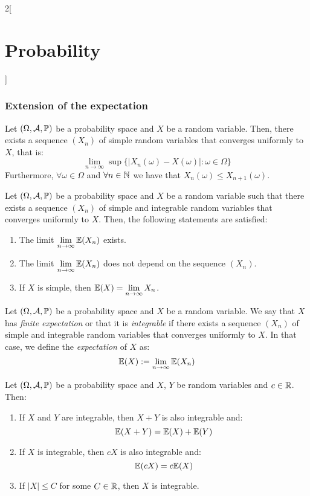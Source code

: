 \documentclass[../../../main.tex]{subfiles}
\begin{document}
\begin{multicols}{2}[\section{Probability}]
  \subsubsection{Extension of the expectation}
  \begin{prop}
    Let $(\Omega,\mathcal{A},\mathbb{P})$ be a probability space and $X$ be a random variable. Then, there exists a sequence $(X_n)$ of simple random variables that converges uniformly to $X$, that is: $$\lim_{n\to\infty}\sup\{|X_n(\omega)-X(\omega)|:\omega\in\Omega\}$$ Furthermore, $\forall\omega\in\Omega$ and $\forall n\in\mathbb{N}$ we have that $X_n(\omega)\leq X_{n+1}(\omega)$.
  \end{prop}
  \begin{theorem}
    Let $(\Omega,\mathcal{A},\mathbb{P})$ be a probability space and $X$ be a random variable such that there exists a sequence $(X_n)$ of simple and integrable random variables that converges uniformly to $X$. Then, the following statements are satisfied:
    \begin{enumerate}
      \item The limit $\displaystyle\lim_{n\to\infty}\mathbb{E}(X_n)$ exists.
      \item The limit $\displaystyle\lim_{n\to\infty}\mathbb{E}(X_n)$ does not depend on the sequence $(X_n)$.
      \item If $X$ is simple, then $\displaystyle\mathbb{E}(X)=\lim_{n\to\infty}X_n$.
    \end{enumerate}
  \end{theorem}
  \begin{definition}[Expectation]
    Let $(\Omega,\mathcal{A},\mathbb{P})$ be a probability space and $X$ be a random variable. We say that $X$ has \textit{finite expectation} or that it is \textit{integrable} if there exists a sequence $(X_n)$ of simple and integrable random variables that converges uniformly to $X$. In that case, we define the \textit{expectation} of $X$ as: $$\mathbb{E}(X):=\lim_{n\to\infty}\mathbb{E}(X_n)$$
  \end{definition}
  \begin{prop}
    Let $(\Omega,\mathcal{A},\mathbb{P})$ be a probability space and $X$, $Y$ be random variables and $c\in\mathbb{R}$. Then:
    \begin{enumerate}
      \item If $X$ and $Y$ are integrable, then $X+Y$ is also integrable and: $$\mathbb{E}(X+Y)=\mathbb{E}(X)+\mathbb{E}(Y)$$
      \item If $X$ is integrable, then $cX$ is also integrable and: $$\mathbb{E}(cX)=c\mathbb{E}(X)$$
      \item If $|X|\leq C$ for some $C\in \mathbb{R}$, then $X$ is integrable.

\end{enumerate}
\end{prop}
\end{multicols}
\end{document}
